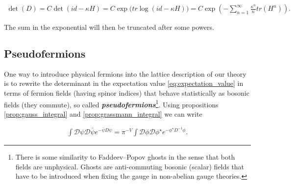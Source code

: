 \documentclass{article}
\theoremstyle{plain} %
\theoremstyle{convention} %
\theoremstyle{remark} %
\def\df#1{\textbf{\textit{#1}}}
\numberwithin{equation}{section}
\begin{document}
\begin{align*}
    \det(D) = C \det(id - \kappa H) = C \exp\big(tr \log(id - \kappa H)\big) = C \exp(- \sum_{n=1}^{\infty} \frac{\kappa^n}{n} tr(H^n)).
\end{align*}

The sum in the exponential will then be truncated after some powers.

\subsection{Pseudofermions}

One way to introduce physical fermions into the lattice description of our theory is to rewrite the determinant in the expectation value \eqref{eq:expectation_value} in terms of fermion fields (having spinor indices) that behave statistically as bosonic fields (they commute), so called \df{pseudofermions}\footnote{There is some similarity to Faddeev–Popov ghosts in the sense that both fields are unphysical. Ghosts are anti-commuting bosonic (scalar) fields that have to be introduced when fixing the gauge in non-abelian gauge theories.}. Using propositions \ref{prop:gauss_integral} and \ref{prop:grassmann_integral} we can write

\begin{align*}
  \int \mathcal{D}\psi \mathcal{D} \bar{\psi} e^{ - \bar{\psi} D \psi } = \pi^{-V} \int \mathcal{D}\phi \mathcal{D} \phi^{\star} e^{ - \phi^{\star} D^{-1} \phi }.
\end{align*}
\end{document}
